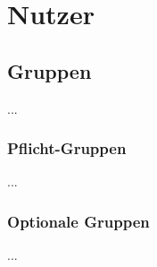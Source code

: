 %
%


\chapter{Nutzer}
\label{Nutzer}


\section{Gruppen}

...
\\


\subsection{Pflicht-Gruppen}

...
\\


\subsection{Optionale Gruppen}

...
\\


